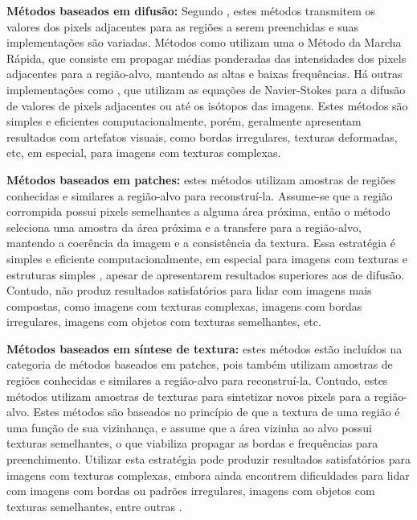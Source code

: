 \begin{list}{}{}


  \item \textbf{Métodos baseados em difusão:} \label{diffusion}
Segundo \cite{black2020evaluation}, estes métodos transmitem os valores dos pixels adjacentes para as regiões a serem preenchidas e suas implementações são variadas. Métodos como \cite{Telea2004} utilizam uma o Método da Marcha Rápida, que consiste em propagar médias ponderadas das intensidades dos pixels adjacentes para a região-alvo, mantendo as altas e baixas frequências. Há outras implementações como \cite{Bertalmio2001navier}, que utilizam as equações de Navier-Stokes para a difusão de valores de pixels adjacentes ou até os isótopos das imagens. Estes métodos são simples e eficientes computacionalmente, porém, geralmente apresentam resultados com artefatos visuais, como bordas irregulares, texturas deformadas, etc, em especial, para imagens com texturas complexas.

  \item \textbf{Métodos baseados em patches:} \label{sample}
estes métodos utilizam amostras de regiões conhecidas e similares a região-alvo para reconstruí-la. Assume-se que a região corrompida possui pixels semelhantes a alguma área próxima, então o método seleciona uma amostra da área próxima e a transfere para a região-alvo, mantendo a coerência da imagem e a consistência da textura. Essa estratégia é simples e eficiente computacionalmente, em especial para imagens com texturas e estruturas simples \cite{patchmatch2009}, apesar de apresentarem resultados superiores aos de difusão. Contudo, não produz resultados satisfatórios para lidar com imagens mais compostas, como imagens com texturas complexas, imagens com bordas irregulares, imagens com objetos com texturas semelhantes, etc.

\item \textbf{Métodos baseados em síntese de textura:} \label{texture}
 estes métodos estão incluídos na categoria de métodos baseados em patches, pois também utilizam amostras de regiões conhecidas e similares a região-alvo para reconstruí-la. Contudo, estes métodos utilizam amostras de texturas para sintetizar novos pixels para a região-alvo. Estes métodos são baseados no princípio de que a textura de uma região é uma função de sua vizinhança, e assume que a área vizinha ao alvo possui texturas semelhantes, o que viabiliza propagar as bordas e frequências para preenchimento. Utilizar esta estratégia pode produzir resultados satisfatórios para imagens com texturas complexas, embora ainda encontrem dificuldades para lidar com imagens com bordas ou padrões irregulares, imagens com objetos com texturas semelhantes, entre outras \cite{bertalmio2003texture}.
\end{list}

